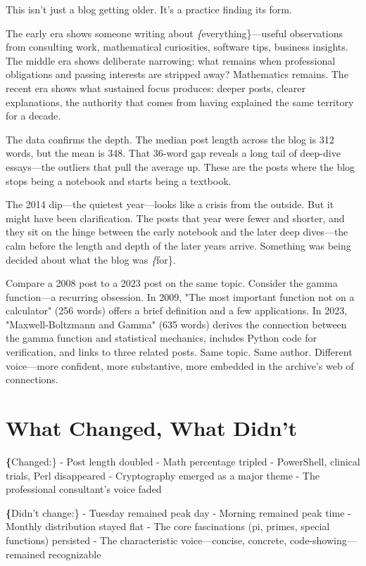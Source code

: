 This isn't just a blog getting older. It's a practice finding its form.

The early era shows someone writing about \textit\{everything\}—useful observations from consulting work, mathematical curiosities, software tips, business insights. The middle era shows deliberate narrowing: what remains when professional obligations and passing interests are stripped away? Mathematics remains. The recent era shows what sustained focus produces: deeper posts, clearer explanations, the authority that comes from having explained the same territory for a decade.

The data confirms the depth. The median post length across the blog is 312 words, but the mean is 348. That 36-word gap reveals a long tail of deep-dive essays—the outliers that pull the average up. These are the posts where the blog stops being a notebook and starts being a textbook.

The 2014 dip—the quietest year—looks like a crisis from the outside. But it might have been clarification. The posts that year were fewer and shorter, and they sit on the hinge between the early notebook and the later deep dives—the calm before the length and depth of the later years arrive. Something was being decided about what the blog was \textit\{for\}.

Compare a 2008 post to a 2023 post on the same topic. Consider the gamma function—a recurring obsession. In 2009, "The most important function not on a calculator" (256 words) offers a brief definition and a few applications. In 2023, "Maxwell-Boltzmann and Gamma" (635 words) derives the connection between the gamma function and statistical mechanics, includes Python code for verification, and links to three related posts. Same topic. Same author. Different voice—more confident, more substantive, more embedded in the archive's web of connections.

\bigskip

\section*{What Changed, What Didn't}

\textbf\{Changed:\}
- Post length doubled
- Math percentage tripled
- PowerShell, clinical trials, Perl disappeared
- Cryptography emerged as a major theme
- The professional consultant's voice faded

\textbf\{Didn't change:\}
- Tuesday remained peak day
- Morning remained peak time
- Monthly distribution stayed flat
- The core fascinations (pi, primes, special functions) persisted
- The characteristic voice—concise, concrete, code-showing—remained recognizable


